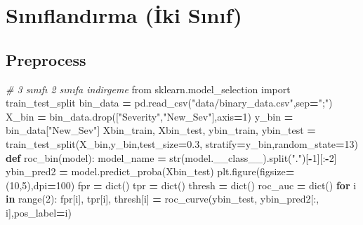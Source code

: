 \documentclass[12pt,twoside]{deuthesis}
\newenvironment{Shaded}{\begin{snugshade}}{\end{snugshade}}
\newcommand{\BuiltInTok}[1]{#1}
\newcommand{\CommentTok}[1]{\textcolor[rgb]{0.56,0.35,0.01}{\textit{#1}}}
\newcommand{\ControlFlowTok}[1]{\textcolor[rgb]{0.13,0.29,0.53}{\textbf{#1}}}
\newcommand{\DecValTok}[1]{\textcolor[rgb]{0.00,0.00,0.81}{#1}}
\newcommand{\FloatTok}[1]{\textcolor[rgb]{0.00,0.00,0.81}{#1}}
\newcommand{\ImportTok}[1]{#1}
\newcommand{\KeywordTok}[1]{\textcolor[rgb]{0.13,0.29,0.53}{\textbf{#1}}}
\newcommand{\NormalTok}[1]{#1}
\newcommand{\OperatorTok}[1]{\textcolor[rgb]{0.81,0.36,0.00}{\textbf{#1}}}
\newcommand{\StringTok}[1]{\textcolor[rgb]{0.31,0.60,0.02}{#1}}
\begin{document}
\hypertarget{sux131nux131flandux131rma-iki-sux131nux131f}{%
\chapter{Sınıflandırma (İki Sınıf)}\label{sux131nux131flandux131rma-iki-sux131nux131f}}

\hypertarget{preprocess}{%
\section{Preprocess}\label{preprocess}}

\scriptsize
\begin{Shaded}
\begin{Highlighting}[]
\CommentTok{\# 3 sınıfı 2 sınıfa indirgeme}
\ImportTok{from}\NormalTok{ sklearn.model\_selection }\ImportTok{import}\NormalTok{ train\_test\_split}
\NormalTok{bin\_data }\OperatorTok{=}\NormalTok{ pd.read\_csv(}\StringTok{"data/binary\_data.csv"}\NormalTok{,sep}\OperatorTok{=}\StringTok{";"}\NormalTok{)}
\NormalTok{X\_bin }\OperatorTok{=}\NormalTok{ bin\_data.drop([}\StringTok{"Severity"}\NormalTok{,}\StringTok{"New\_Sev"}\NormalTok{],axis}\OperatorTok{=}\DecValTok{1}\NormalTok{)}
\NormalTok{y\_bin }\OperatorTok{=}\NormalTok{ bin\_data[}\StringTok{"New\_Sev"}\NormalTok{]}
\NormalTok{Xbin\_train, Xbin\_test, ybin\_train, ybin\_test }\OperatorTok{=}\NormalTok{ train\_test\_split(X\_bin,y\_bin,test\_size}\OperatorTok{=}\FloatTok{0.3}\NormalTok{,}
\NormalTok{                                                                stratify}\OperatorTok{=}\NormalTok{y\_bin,random\_state}\OperatorTok{=}\DecValTok{13}\NormalTok{)}
\KeywordTok{def}\NormalTok{ roc\_bin(model):}
\NormalTok{    model\_name }\OperatorTok{=} \BuiltInTok{str}\NormalTok{(model.\_\_class\_\_).split(}\StringTok{"."}\NormalTok{)[}\OperatorTok{{-}}\DecValTok{1}\NormalTok{][:}\OperatorTok{{-}}\DecValTok{2}\NormalTok{]}
\NormalTok{    ybin\_pred2 }\OperatorTok{=}\NormalTok{ model.predict\_proba(Xbin\_test)}
\NormalTok{    plt.figure(figsize}\OperatorTok{=}\NormalTok{(}\DecValTok{10}\NormalTok{,}\DecValTok{5}\NormalTok{),dpi}\OperatorTok{=}\DecValTok{100}\NormalTok{)}
\NormalTok{    fpr }\OperatorTok{=} \BuiltInTok{dict}\NormalTok{()}
\NormalTok{    tpr }\OperatorTok{=} \BuiltInTok{dict}\NormalTok{()}
\NormalTok{    thresh }\OperatorTok{=} \BuiltInTok{dict}\NormalTok{()}
\NormalTok{    roc\_auc }\OperatorTok{=} \BuiltInTok{dict}\NormalTok{()}
    \ControlFlowTok{for}\NormalTok{ i }\KeywordTok{in} \BuiltInTok{range}\NormalTok{(}\DecValTok{2}\NormalTok{):}
\NormalTok{        fpr[i], tpr[i], thresh[i] }\OperatorTok{=}\NormalTok{ roc\_curve(ybin\_test, ybin\_pred2[:, i],pos\_label}\OperatorTok{=}\NormalTok{i)}

\end{Highlighting}
\end{Shaded}
\end{document}

